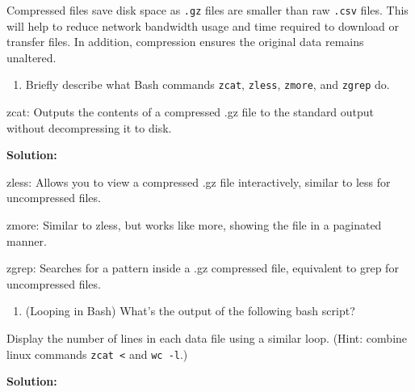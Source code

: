 \documentclass[
]{article}
\newenvironment{Shaded}{\begin{snugshade}}{\end{snugshade}}
\newcommand{\AttributeTok}[1]{\textcolor[rgb]{0.40,0.45,0.13}{#1}}
\newcommand{\BuiltInTok}[1]{\textcolor[rgb]{0.00,0.23,0.31}{#1}}
\newcommand{\ControlFlowTok}[1]{\textcolor[rgb]{0.00,0.23,0.31}{#1}}
\newcommand{\DataTypeTok}[1]{\textcolor[rgb]{0.68,0.00,0.00}{#1}}
\newcommand{\FunctionTok}[1]{\textcolor[rgb]{0.28,0.35,0.67}{#1}}
\newcommand{\KeywordTok}[1]{\textcolor[rgb]{0.00,0.23,0.31}{#1}}
\newcommand{\NormalTok}[1]{\textcolor[rgb]{0.00,0.23,0.31}{#1}}
\newcommand{\OperatorTok}[1]{\textcolor[rgb]{0.37,0.37,0.37}{#1}}
\newcommand{\PreprocessorTok}[1]{\textcolor[rgb]{0.68,0.00,0.00}{#1}}
\newcommand{\StringTok}[1]{\textcolor[rgb]{0.13,0.47,0.30}{#1}}
\newcommand{\VariableTok}[1]{\textcolor[rgb]{0.07,0.07,0.07}{#1}}
\providecommand{\tightlist}{%
  \setlength{\itemsep}{0pt}\setlength{\parskip}{0pt}}\usepackage{longtable,booktabs,array}
\begin{document}
Compressed files save disk space as \texttt{.gz} files are smaller than
raw \texttt{.csv} files. This will help to reduce network bandwidth
usage and time required to download or transfer files. In addition,
compression ensures the original data remains unaltered.

\begin{enumerate}
\def\labelenumi{\arabic{enumi}.}
\setcounter{enumi}{2}
\tightlist
\item
  Briefly describe what Bash commands \texttt{zcat}, \texttt{zless},
  \texttt{zmore}, and \texttt{zgrep} do.
\end{enumerate}

zcat: Outputs the contents of a compressed .gz file to the standard
output without decompressing it to disk.

\textbf{Solution:}

zless: Allows you to view a compressed .gz file interactively, similar
to less for uncompressed files.

zmore: Similar to zless, but works like more, showing the file in a
paginated manner.

zgrep: Searches for a pattern inside a .gz compressed file, equivalent
to grep for uncompressed files.

\begin{enumerate}
\def\labelenumi{\arabic{enumi}.}
\setcounter{enumi}{3}
\tightlist
\item
  (Looping in Bash) What's the output of the following bash script?
\end{enumerate}

\begin{Shaded}
\end{Shaded}

Display the number of lines in each data file using a similar loop.
(Hint: combine linux commands \texttt{zcat\ \textless{}} and
\texttt{wc\ -l}.)

\textbf{Solution:}

\begin{Shaded}
\end{Shaded}
\end{document}
